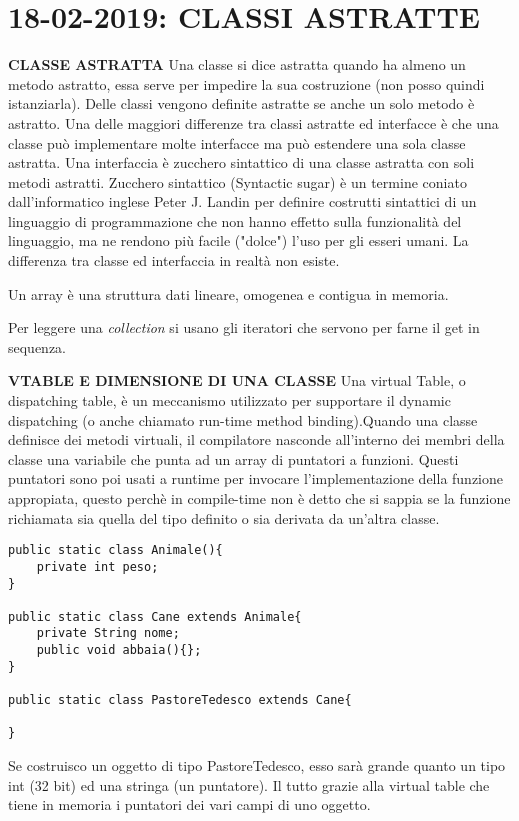
\newpage
\section{18-02-2019: CLASSI ASTRATTE}
\textbf{CLASSE ASTRATTA} \newline
Una classe si dice astratta quando ha almeno un metodo astratto, essa serve per impedire la sua costruzione (non posso quindi istanziarla). Delle classi vengono definite astratte se anche un solo metodo è astratto. Una delle maggiori differenze tra classi astratte ed interfacce è che una classe può implementare molte interfacce ma può estendere una sola classe astratta. Una interfaccia è zucchero sintattico di una classe astratta con soli metodi astratti. Zucchero sintattico (Syntactic sugar) è un termine coniato dall'informatico inglese Peter J. Landin per definire costrutti sintattici di un linguaggio di programmazione che non hanno effetto sulla funzionalità del linguaggio, ma ne rendono più facile ("dolce") l'uso per gli esseri umani. La differenza tra classe ed interfaccia in realtà non esiste.

\noindent Un array è una struttura dati lineare, omogenea e contigua in memoria.

\noindent Per leggere una \textit{collection} si usano gli iteratori che servono per farne il get in sequenza.

\noindent \textbf{VTABLE E DIMENSIONE DI UNA CLASSE} \newline
Una virtual Table, o dispatching table, è un meccanismo utilizzato per supportare il dynamic dispatching (o anche chiamato run-time method binding).Quando una classe definisce dei metodi virtuali, il compilatore nasconde all'interno dei membri della classe una variabile che punta ad un array di puntatori a funzioni. Questi puntatori sono poi usati a runtime per invocare l'implementazione della funzione appropiata, questo perchè in compile-time non è detto che si sappia se la funzione richiamata sia quella del tipo definito o sia derivata da un'altra classe.

\begin{lstlisting}
public static class Animale(){
	private int peso;
}

public static class Cane extends Animale{
	private String nome;
	public void abbaia(){};
}

public static class PastoreTedesco extends Cane{

}
\end{lstlisting}
Se costruisco un oggetto di tipo PastoreTedesco, esso sarà grande quanto un tipo int (32 bit) ed una stringa (un puntatore).
Il tutto grazie alla virtual table che tiene in memoria i puntatori dei vari campi di uno oggetto.






